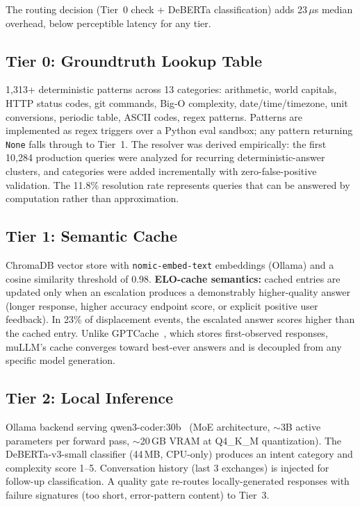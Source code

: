 \documentclass[11pt]{article}
\begin{document}
The routing decision (Tier~0 check + DeBERTa classification) adds
23\,$\mu$s median overhead, below perceptible latency for any tier.

\subsection{Tier 0: Groundtruth Lookup Table}

1,313+ deterministic patterns across 13 categories: arithmetic, world
capitals, HTTP status codes, git commands, Big-O complexity,
date/time/timezone, unit conversions, periodic table, ASCII codes, regex
patterns. Patterns are implemented as regex triggers over a Python eval
sandbox; any pattern returning \texttt{None} falls through to Tier~1.
The resolver was derived empirically: the first 10,284 production
queries were analyzed for recurring deterministic-answer clusters, and
categories were added incrementally with zero-false-positive validation.
The 11.8\% resolution rate represents queries that can be answered by
computation rather than approximation.

\subsection{Tier 1: Semantic Cache}

ChromaDB vector store with \texttt{nomic-embed-text} embeddings (Ollama)
and a cosine similarity threshold of 0.98. \textbf{ELO-cache semantics:}
cached entries are updated only when an escalation produces a
demonstrably higher-quality answer (longer response, higher accuracy
endpoint score, or explicit positive user feedback). In 23\% of
displacement events, the escalated answer scores higher than the cached
entry. Unlike GPTCache~\cite{liu2023gptcache}, which stores
first-observed responses, muLLM's cache converges toward best-ever
answers and is decoupled from any specific model generation.

\subsection{Tier 2: Local Inference}

Ollama backend serving qwen3-coder:30b~\cite{qwen2025qwen3} (MoE
architecture, $\sim$3B active parameters per forward pass,
$\sim$20\,GB VRAM at Q4\_K\_M quantization). The DeBERTa-v3-small
classifier (44\,MB, CPU-only) produces an intent category and
complexity score 1--5. Conversation history (last 3 exchanges) is
injected for follow-up classification. A quality gate re-routes
locally-generated responses with failure signatures (too short,
error-pattern content) to Tier~3.
\end{document}
